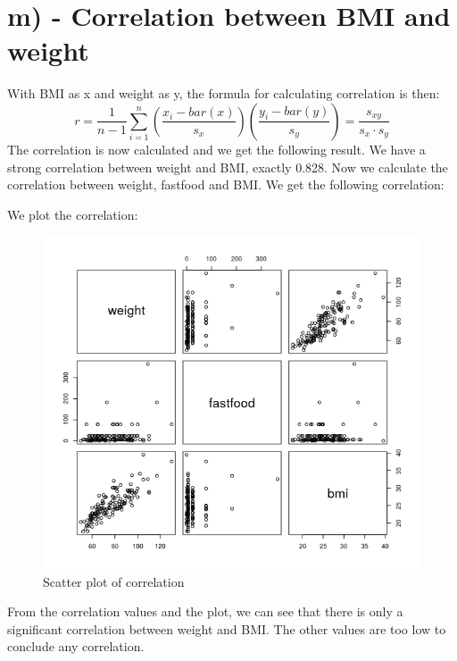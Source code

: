\documentclass{memoir}
\begin{document}
\section{m) - Correlation between BMI and weight} 
With BMI as x and weight as y, the formula for calculating correlation is then: 
$$ r = \frac{1}{n-1} \sum_{i = 1}^{n} (\frac{x_i-bar(x)}{s_x}) (\frac{y_i-bar(y)}{s_y}) = \frac{s_{xy}}{s_x \cdot s_y}$$ 
The correlation is now calculated and we get the following result. We have a strong correlation between weight and BMI, exactly 0.828. 
Now we calculate the correlation between weight, fastfood and BMI. 
We get the following correlation:
\begin{table}[H]
\centering
\caption{Correlation}
\label{table 2.4}
\end{table}

We plot the correlation: 

\begin{figure}[H]
	\centering
	\includegraphics[scale=0.8]{scatter.png}
	\caption{Scatter plot of correlation}
\end{figure}
From the correlation values and the plot, we can see that there is only a significant correlation between weight and BMI. The other values are too low to conclude any correlation.


%
%
\end{document}
